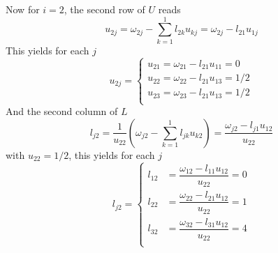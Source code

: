 \documentclass[../../../main.tex]{subfiles}
\begin{document}
\begin{enumerate}
          Now for $i=2$, the second row of $U$ reads
          \begin{equation*}
              u_{2j}=\omega_{2j}-\sum_{k=1 }^{1}l_{2k}u_{kj}=\omega_{2j}-l_{21}u_{1j}
          \end{equation*}
          This yields for each $j$
          \begin{equation*}
              u_{2j} =
              \begin{cases}
                  u_{21}=\omega_{21}-l_{21}u_{11}=0   \\
                  u_{22}=\omega_{22}-l_{21}u_{13}=1/2 \\
                  u_{23}=\omega_{23}-l_{21}u_{13}=1/2 \\
              \end{cases}
          \end{equation*}
          And the second column of $L$
          \begin{equation*}
              l_{j2}=\frac{1 }{u_{22}}\left( \omega_{j2}-\sum_{k=1}^{ 1 }l_{jk}u_{k2} \right) = \frac{\omega_{j2 }-l_{j1}u_{12}}{u_{22}}
          \end{equation*}
          with $u_{22}=1/2$, this yields for each $j$
          \begin{equation*}
              l_{j2} =
              \begin{cases}
                  l_{12} & = \dfrac{\omega_{12 }-l_{11}u_{12}}{u_{22}}=0 \\[8pt]
                  l_{22} & = \dfrac{\omega_{22 }-l_{21}u_{12}}{u_{22}}=1 \\[8pt]
                  l_{32} & = \dfrac{\omega_{32 }-l_{31}u_{12}}{u_{22}}=4 \\[8pt]
              \end{cases}
          \end{equation*}


\end{enumerate}
\end{document}
